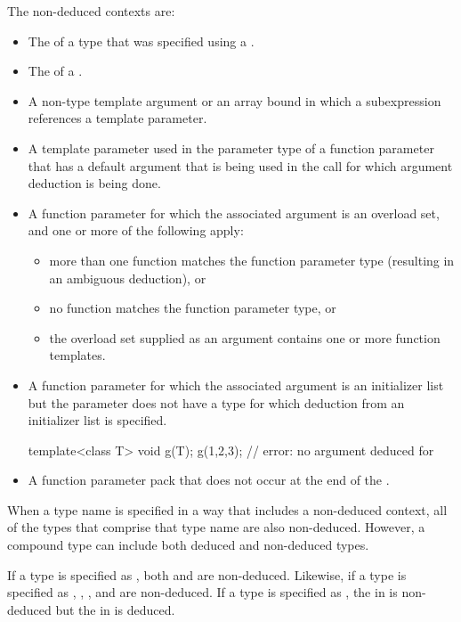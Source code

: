 \pnum
The non-deduced contexts are:
%
\begin{itemize}
\item
The
of a type that was specified using a
.
\item
The  of a .
\item
A non-type template argument or an array bound in which a subexpression
references a template parameter.
\item
A template parameter used in the parameter type of a function parameter that
has a default argument that is being used in the call for which argument
deduction is being done.
\item
A function parameter for which the associated argument is an
overload set, and one or more of the following apply:
\begin{itemize}
\item
more than one function matches the function parameter type (resulting in
an ambiguous deduction), or
\item
no function matches the function parameter type, or
\item
the overload set supplied as an argument contains one or more function templates.
\end{itemize}
\item A function parameter for which the associated argument is an initializer
list but the parameter does not have
a type for which deduction from an initializer list is specified.
\begin{example}
\begin{codeblock}
template<class T> void g(T);
g({1,2,3});                 // error: no argument deduced for 
\end{codeblock}
\end{example}
\item A function parameter pack that does not occur at the end of the
.
\end{itemize}

\pnum
When a type name is specified in a way that includes a non-deduced
context, all of the types that comprise that type name are also
non-deduced.
However, a compound type can include both deduced and non-deduced types.
\begin{example}
If a type is specified as
,
both
and
are non-deduced.
Likewise, if a type is specified as
,
,
,
and
are non-deduced.
If a type is specified as
,
the
in
is non-deduced but
the
in
is deduced.
\end{example}

